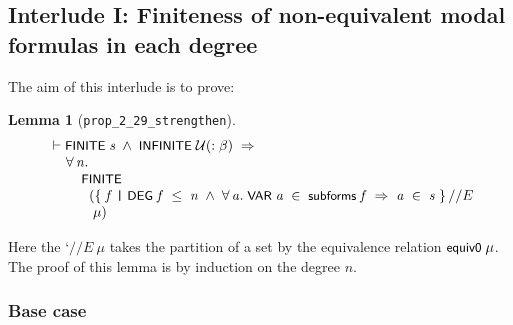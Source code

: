 \documentclass[letterpaper]{article}
\newtheorem{lm}{Lemma}
\renewcommand{\HOLConst}[1]{{\textsf{\upshape\small #1}}}
\renewcommand{\HOLinline}[1]{\ensuremath{#1}}
\newenvironment{holmath}{\begin{displaymath}\begin{array}{l}}{\end{array}\end{displaymath}\ignorespacesafterend}
\begin{document}
\subsection{Interlude I: Finiteness of non-equivalent modal formulas in each degree}

The aim of this interlude is to prove:

\begin{lm}[\texttt{prop_2_29_strengthen}]
\begin{holmath}
  \ensuremath{\HOLTokenTurnstile}\HOLConst{FINITE}\;\HOLFreeVar{s}\;\HOLSymConst{\HOLTokenConj{}}\;\HOLConst{INFINITE}\;\ensuremath{\cal{U}}(:\ensuremath{\beta})\;\HOLSymConst{\HOLTokenImp{}}\\
\;\;\;\;\;\HOLSymConst{\HOLTokenForall{}}\HOLBoundVar{n}.\\
\;\;\;\;\;\;\;\;\;\HOLConst{FINITE}\\
\;\;\;\;\;\;\;\;\;\;\;(\HOLTokenLeftbrace{}\HOLBoundVar{f}\;\HOLTokenBar{}\;\HOLConst{DEG}\;\HOLBoundVar{f}\;\HOLSymConst{\HOLTokenLeq{}}\;\HOLBoundVar{n}\;\HOLSymConst{\HOLTokenConj{}}\;\HOLSymConst{\HOLTokenForall{}}\HOLBoundVar{a}.\;\HOLConst{VAR}\;\HOLBoundVar{a}\;\HOLSymConst{\HOLTokenIn{}}\;\HOLConst{subforms}\;\HOLBoundVar{f}\;\HOLSymConst{\HOLTokenImp{}}\;\HOLBoundVar{a}\;\HOLSymConst{\HOLTokenIn{}}\;\HOLFreeVar{s}\HOLTokenRightbrace{}\HOLSymConst{//E}\\
\;\;\;\;\;\;\;\;\;\;\;\;\HOLFreeVar{\ensuremath{\mu}})
\end{holmath}
\end{lm}

Here the `$// E\ \mu$ takes the partition of a set by the equivalence relation \HOLinline{\HOLConst{equiv0}\;\HOLFreeVar{\ensuremath{\mu}}}. The proof of this lemma is by induction on the degree $n$.

\subsubsection{Base case}
\end{document}
